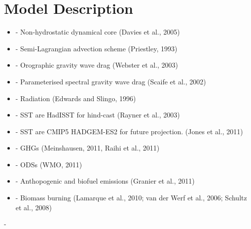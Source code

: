 \section{Model Description}

\begin{itemize}
\item -	Non-hydrostatic dynamical core (Davies et al., 2005)
\end{itemize}
\begin{itemize}
\item -	Semi-Lagrangian advection scheme (Priestley, 1993)
\end{itemize}
\begin{itemize}
\item -	Orographic gravity wave drag (Webster et al., 2003)
\end{itemize}
\begin{itemize}
\item -	Parameterised spectral gravity wave drag (Scaife et al., 2002)
\end{itemize}
\begin{itemize}
\item -	Radiation (Edwards and Slingo, 1996)
\end{itemize}
\begin{itemize}
\item -	SST are HadISST for hind-cast (Rayner et al., 2003)
\end{itemize}
\begin{itemize}
\item -	SST are CMIP5 HADGEM-ES2 for future projection. (Jones et al., 2011)
\end{itemize}
\begin{itemize}
\item -	GHGs (Meinshausen, 2011, Raihi et al., 2011)
\end{itemize}
\begin{itemize}
\item -	ODSs (WMO, 2011)
\end{itemize}
\begin{itemize}
\item -	Anthopogenic and biofuel emissions (Granier et al., 2011)
\end{itemize}
\begin{itemize}
\item -	Biomass burning (Lamarque et al., 2010; van der Werf et al., 2006; Schultz et al., 2008)
\end{itemize}
-	



